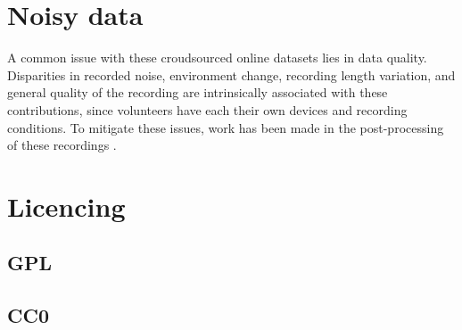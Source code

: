 \section{Noisy data}

A common issue with these croudsourced online datasets lies in data quality. Disparities in recorded noise, environment change, recording length variation, and general quality of the recording are intrinsically associated with these contributions, since volunteers have each their own devices and recording conditions. To mitigate these issues, work has been made in the post-processing of these recordings \cite{krishna2019speech}.

\section{Licencing}

\subsection{GPL}

\subsection{CC0}
